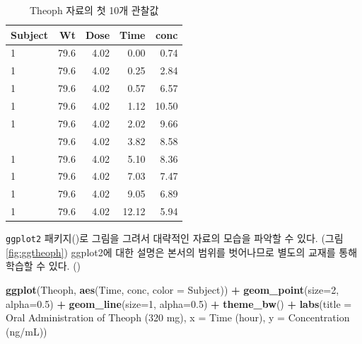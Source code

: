\documentclass[
  11pt,
  krantz2, a4paper, twoside]{krantz}
\newenvironment{Shaded}{\begin{snugshade}}{\end{snugshade}}
\newcommand{\AttributeTok}[1]{\textcolor[rgb]{0.13,0.29,0.53}{#1}}
\newcommand{\DecValTok}[1]{\textcolor[rgb]{0.00,0.00,0.81}{#1}}
\newcommand{\FloatTok}[1]{\textcolor[rgb]{0.00,0.00,0.81}{#1}}
\newcommand{\FunctionTok}[1]{\textcolor[rgb]{0.13,0.29,0.53}{\textbf{#1}}}
\newcommand{\NormalTok}[1]{#1}
\newcommand{\SpecialCharTok}[1]{\textcolor[rgb]{0.81,0.36,0.00}{\textbf{#1}}}
\newcommand{\StringTok}[1]{\textcolor[rgb]{0.31,0.60,0.02}{#1}}
\theoremstyle{definition}
\theoremstyle{definition}
\theoremstyle{definition}
\theoremstyle{definition}
\theoremstyle{remark}
\begin{document}
\begin{table}

\caption{\label{tab:head}Theoph 자료의 첫 10개 관찰값}
\centering
\begin{tabular}[t]{lrrrr}
\toprule
Subject & Wt & Dose & Time & conc\\
\midrule
1 & 79.6 & 4.02 & 0.00 & 0.74\\
1 & 79.6 & 4.02 & 0.25 & 2.84\\
1 & 79.6 & 4.02 & 0.57 & 6.57\\
1 & 79.6 & 4.02 & 1.12 & 10.50\\
1 & 79.6 & 4.02 & 2.02 & 9.66\\
\addlinespace
1 & 79.6 & 4.02 & 3.82 & 8.58\\
1 & 79.6 & 4.02 & 5.10 & 8.36\\
1 & 79.6 & 4.02 & 7.03 & 7.47\\
1 & 79.6 & 4.02 & 9.05 & 6.89\\
1 & 79.6 & 4.02 & 12.12 & 5.94\\
\bottomrule
\end{tabular}
\end{table}

\texttt{ggplot2} 패키지()로 그림을 그려서 대략적인 자료의 모습을 파악할 수 있다. (그림 \ref{fig:ggtheoph}) ggplot2에 대한 설명은 본서의 범위를 벗어나므로 별도의 교재를 통해 학습할 수 있다. ()

\begin{Shaded}
\begin{Highlighting}[]
\FunctionTok{ggplot}\NormalTok{(Theoph, }\FunctionTok{aes}\NormalTok{(Time, conc, }\AttributeTok{color =}\NormalTok{ Subject)) }\SpecialCharTok{+}
  \FunctionTok{geom\_point}\NormalTok{(}\AttributeTok{size=}\DecValTok{2}\NormalTok{, }\AttributeTok{alpha=}\FloatTok{0.5}\NormalTok{) }\SpecialCharTok{+} 
  \FunctionTok{geom\_line}\NormalTok{(}\AttributeTok{size=}\DecValTok{1}\NormalTok{, }\AttributeTok{alpha=}\FloatTok{0.5}\NormalTok{) }\SpecialCharTok{+}
  \FunctionTok{theme\_bw}\NormalTok{() }\SpecialCharTok{+}
  \FunctionTok{labs}\NormalTok{(}\AttributeTok{title =} \StringTok{\textquotesingle{}Oral Administration of Theoph (320 mg)\textquotesingle{}}\NormalTok{,}
       \AttributeTok{x =} \StringTok{\textquotesingle{}Time (hour)\textquotesingle{}}\NormalTok{, }\AttributeTok{y =} \StringTok{\textquotesingle{}Concentration (ng/mL)\textquotesingle{}}\NormalTok{)}
\end{Highlighting}
\end{Shaded}
\end{document}

